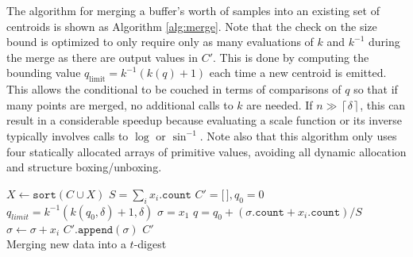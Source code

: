 \documentclass[]{statsoc}
\begin{document}
The algorithm for merging a buffer's worth of samples into an existing set of centroids is shown as Algorithm \ref{alg:merge}. Note that the check on the size bound is optimized to only require only as many evaluations of $k$ and $k^{-1}$ during the merge as there are output values in $C'$. This is done by computing the bounding value $q_{\mathrm {limit}} = k^{-1}(k(q) + 1)$ each time a new centroid is emitted. This allows the conditional to be couched in terms of comparisons of $q$ so that if many points are merged, no additional calls to $k$ are needed. If $n \gg  \left \lceil \delta \right \rceil$, this can result in a considerable speedup because evaluating a scale function or its inverse typically involves calls to $\log$ or $\sin^{-1}$. Note also that this algorithm only uses four statically allocated arrays of primitive values, avoiding all dynamic allocation and structure boxing/unboxing.
\begin{algorithm}[ht]
\SetNoFillComment
{}
$X \gets \mathtt{sort}(C \cup X)$\;
$ S = \sum_i x_i.\mathtt{count}$\;
$C' = \lbrack \, \rbrack, q_0 = 0$\;
$q_{limit}=k^{-1}(k(q_0, \delta)+1, \delta)$\;
$\sigma = x_1$\;
 {
  $q = q_0 + (\sigma.\mathtt{count} + x_i.\mathtt{count})/S$\;
   {
      $\sigma \gets \sigma + x_i$\;
  } 
} 
$C'\mathtt{.append}(\sigma)$\;
\Return $ C' $\\
\caption{Merging new data into a $t$-digest\label{alg:merge}}
\end{algorithm}
\end{document}
